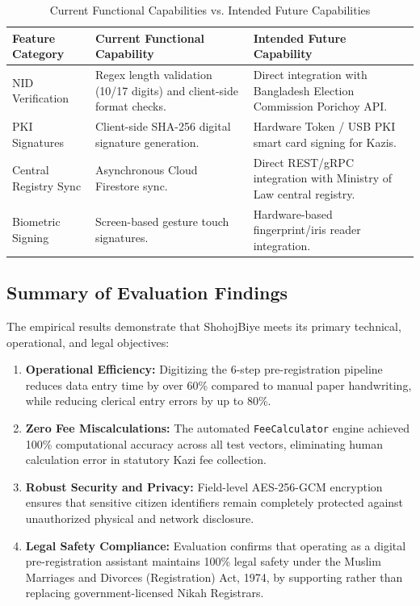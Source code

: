 \documentclass[12pt,a4paper]{article}
\begin{document}
	\begin{table}[h!]
		\centering
		\small
		\caption{Current Functional Capabilities vs. Intended Future Capabilities}
		\label{tab:capabilities_comparison}
		\begin{tabularx}{\textwidth}{@{}l L L@{}}
			\toprule
			\textbf{Feature Category} & \textbf{Current Functional Capability} & \textbf{Intended Future Capability} \\ \midrule
			NID Verification & Regex length validation (10/17 digits) and client-side format checks. & Direct integration with Bangladesh Election Commission Porichoy API. \\ \addlinespace
			PKI Signatures & Client-side SHA-256 digital signature generation. & Hardware Token / USB PKI smart card signing for Kazis. \\ \addlinespace
			Central Registry Sync & Asynchronous Cloud Firestore sync. & Direct REST/gRPC integration with Ministry of Law central registry. \\ \addlinespace
			Biometric Signing & Screen-based gesture touch signatures. & Hardware-based fingerprint/iris reader integration. \\ \bottomrule
		\end{tabularx}
	\end{table}
	
	\subsection{Summary of Evaluation Findings}
	The empirical results demonstrate that ShohojBiye meets its primary technical, operational, and legal objectives:
	\begin{enumerate}
		\item \textbf{Operational Efficiency:} Digitizing the 6-step pre-registration pipeline reduces data entry time by over 60\% compared to manual paper handwriting, while reducing clerical entry errors by up to 80\%.
		\item \textbf{Zero Fee Miscalculations:} The automated \texttt{FeeCalculator} engine achieved 100\% computational accuracy across all test vectors, eliminating human calculation error in statutory Kazi fee collection.
		\item \textbf{Robust Security and Privacy:} Field-level AES-256-GCM encryption ensures that sensitive citizen identifiers remain completely protected against unauthorized physical and network disclosure.
		\item \textbf{Legal Safety Compliance:} Evaluation confirms that operating as a digital pre-registration assistant maintains 100\% legal safety under the Muslim Marriages and Divorces (Registration) Act, 1974, by supporting rather than replacing government-licensed Nikah Registrars.
	\end{enumerate}
	
\end{document}
